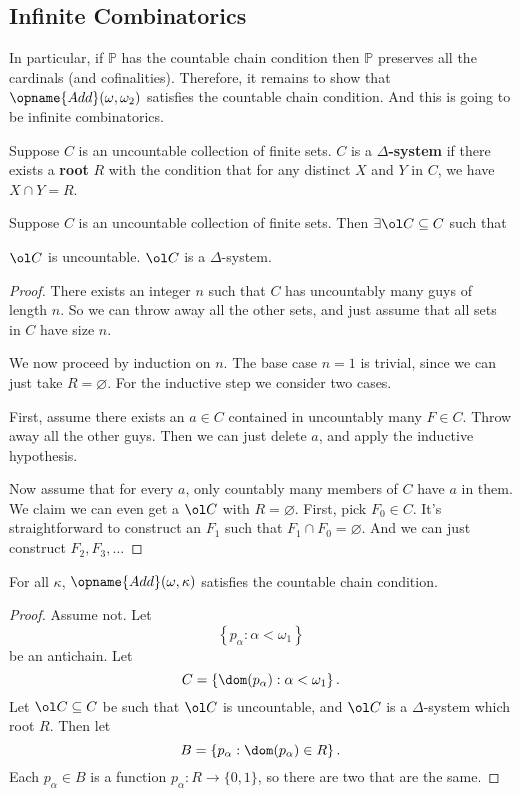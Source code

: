 \documentclass[11pt]{scrreprt}
\newcommand{\Po}{\mathbb P}
\begin{document}
\subsection{Infinite Combinatorics}
In particular, if $\Po$ has the countable chain condition then $\Po$ preserves all the cardinals (and cofinalities).
Therefore, it remains to show that $\opname{Add}(\omega, \omega_2)$ satisfies the countable chain condition.
And this is going to be infinite combinatorics.

\begin{definition}
	Suppose $C$ is an uncountable collection of finite sets.
	$C$ is a \textbf{$\Delta$-system} if there exists a \textbf{root} $R$
	with the condition that for any distinct $X$ and $Y$
	in $C$, we have $X \cap Y = R$.
\end{definition}

\begin{lemma}
	 Suppose $C$ is an uncountable collection of finite sets.
	Then $\exists \ol C \subseteq C$ such that
	\begin{enumerate}[(1)]
		\ii $\ol C$ is uncountable.
		\ii $\ol C$ is a $\Delta$-system.
	\end{enumerate}
\end{lemma}
\begin{proof}
	There exists an integer $n$ such that $C$ has uncountably many guys of length $n$.
	So we can throw away all the other sets, and just assume that all sets in $C$ have size $n$.

	We now proceed by induction on $n$.
	The base case $n=1$ is trivial, since we can just take $R = \varnothing$.
	For the inductive step we consider two cases.

	First, assume there exists an $a \in C$ contained in uncountably many $F \in C$.
	Throw away all the other guys.
	Then we can just delete $a$, and apply the inductive hypothesis.

	Now assume that for every $a$, only countably many members of $C$ have $a$ in them.
	We claim we can even get a $\ol C$ with $R = \varnothing$.
	First, pick $F_0 \in C$.
	It's straightforward to construct an $F_1$ such that $F_1 \cap F_0 = \varnothing$.
	And we can just construct $F_2, F_3, \dots$
\end{proof}

\begin{lemma}
	For all $\kappa$, $\opname{Add}(\omega, \kappa)$ satisfies the countable chain condition.
\end{lemma}
\begin{proof}
	Assume not. Let
	\[ \left\{ p_\alpha : \alpha < \omega_1 \right\} \]
	be an antichain.  Let
	\[ C = \left\{ \dom(p_\alpha) : \alpha < \omega_1 \right\}. \]
	Let $\ol C \subseteq C$ be such that $\ol C$ is uncountable, and $\ol C$ is a $\Delta$-system which root $R$.
	Then let
	\[ B = \left\{ p_\alpha : \dom(p_\alpha) \in R \right\}. \]
	Each $p_\alpha \in B$ is a function $p_\alpha : R \to \{0,1\}$,
	so there are two that are the same.
\end{proof}
\end{document}

